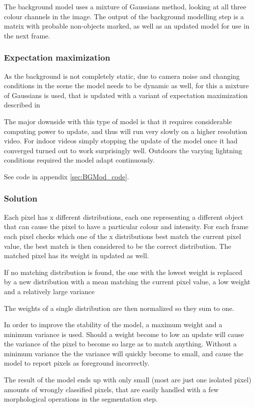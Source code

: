 The background model uses a mixture of Gaussians method, looking at all three colour channels in the image. The output of the background modelling step is a matrix with probable non-objects marked, as well as an updated model for use in the next frame.

\subsubsection{Expectation maximization}

As the background is not completely static, due to camera noise and changing conditions in the scene the model needs to be dynamic as well, for this a mixture of Gaussians is used, that is updated with a variant of expectation maximization described in \cite{wood}

The major downside with this type of model is that it requires considerable computing power to update, and thus will run very slowly on a higher resolution video. For indoor videos simply stopping the update of the model once it had converged turned out to work surprisingly well. Outdoors the varying lightning conditions required the model adapt continuously.

See code in appendix \ref{sec:BGMod_code}. %

\subsubsection{Solution}

Each pixel has x different distributions, each one representing a different object that can cause the pixel to have a particular colour and intensity. For each frame each pixel checks which one of the x distributions best match the current pixel value, the best match is then considered to be the correct distribution. The matched pixel has its weight in updated as well. 

If no matching distribution is found, the one with the lowest weight is replaced by a new distribution with a mean matching the current pixel value, a low weight and a relatively large variance

The weights of a single distribution are then normalized so they sum to one.

In order to improve the stability of the model, a maximum weight and a minimum variance is used. Should a weight become to low an update will cause the variance of the pixel to become so large as to match anything. Without a minimum variance the the variance will quickly become to small, and cause the model to report pixels as foreground incorrectly.

The result of the model ends up with only small (most are just one isolated pixel) amounts of wrongly classified pixels, that are easily handled with a few morphological operations in the segmentation step.

